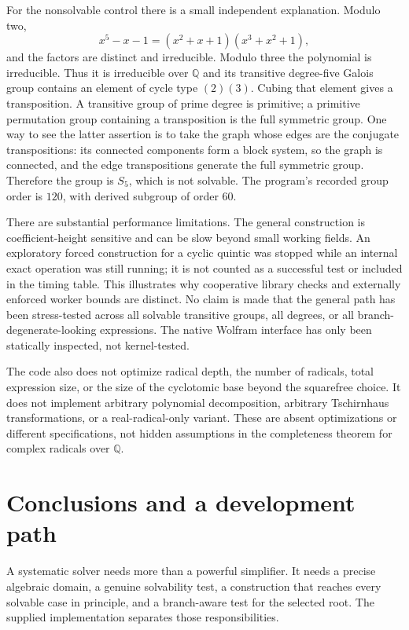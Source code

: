 \documentclass[11pt,a4paper]{article}
\theoremstyle{definition}
\theoremstyle{remark}
\newcommand{\Q}{\mathbb Q}
\begin{document}
For the nonsolvable control there is a small independent explanation. Modulo
two,
\[
 x^5-x-1=(x^2+x+1)(x^3+x^2+1),
\]
and the factors are distinct and irreducible. Modulo three the polynomial is
irreducible. Thus it is irreducible over $\Q$ and its transitive degree-five
Galois group contains an element of cycle type $(2)(3)$. Cubing that element
gives a transposition. A transitive group of prime degree is primitive; a
primitive permutation group containing a transposition is the full symmetric
group. One way to see the latter assertion is to take the graph whose edges
are the conjugate transpositions: its connected components form a block
system, so the graph is connected, and the edge transpositions generate the
full symmetric group. Therefore the group is $S_5$, which is not solvable.
The program's recorded group order is $120$, with derived subgroup of order
$60$.

There are substantial performance limitations. The general construction is
coefficient-height sensitive and can be slow beyond small working fields.
An exploratory forced construction for a cyclic quintic was stopped while an
internal exact operation was still running; it is not counted as a successful
test or included in the timing table. This illustrates why cooperative library
checks and externally enforced worker bounds are distinct. No claim is made
that the general path has been stress-tested across all solvable transitive
groups, all degrees, or all branch-degenerate-looking expressions. The native
Wolfram interface has only been statically inspected, not kernel-tested.

The code also does not optimize radical depth, the number of radicals, total
expression size, or the size of the cyclotomic base beyond the squarefree
choice. It does not implement arbitrary polynomial decomposition, arbitrary
Tschirnhaus transformations, or a real-radical-only variant. These are absent
optimizations or different specifications, not hidden assumptions in the
completeness theorem for complex radicals over $\Q$.

\section{Conclusions and a development path}
A systematic solver needs more than a powerful simplifier. It needs a precise
algebraic domain, a genuine solvability test, a construction that reaches every
solvable case in principle, and a branch-aware test for the selected root.
The supplied implementation separates those responsibilities.
\end{document}
